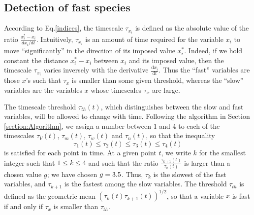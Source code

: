 \documentclass{llncs}
\newcommand{\D}[2]{ \ensuremath{ \frac{\mathrm{d} #1 }{\mathrm{d} #2 } }}
\begin{document}
%        


\iffalse\FloatBarrier\fi
\subsection{Detection of fast species}
According to Eq.\eqref{indices}, the timescale $\tau_{x_i}$  is defined as the
absolute value of the ratio $\frac{x_i^*-x_i}{dx_i/dt}$.  Intuitively,
$\tau_{x_i}$ is an amount of time required for the variable $x_i$ to move
``significantly'' in the direction of its imposed value $x_i^*$. Indeed, if we
hold constant the distance $x_i^*-x_i$ between $x_i$ and its imposed value,
then the timescale $\tau_{x_i}$ varies inversely with the derivative
$\D{x_i}{t}$.  Thus the ``fast'' variables are those $x$'s such that $\tau_x$
is smaller than some given threshold, whereas the ``slow'' variables are the
variables $x$ whose timescales $\tau_x$ are large.

	The timescale threshold $\tau_{th}(t)$, which distinguishes between the
	slow and fast variables, will be allowed to change with time.  Following
	the algorithm in Section \ref{section:Algorithm}, we assign a number
	between 1 and 4 to each of the timescales $\tau_V(t)$, $\tau_m(t)$,
	$\tau_w(t)$ and $\tau_n(t)$, so that the inequality $$\tau_1(t) \leq
	\tau_2(t) \leq \tau_3(t) \leq \tau_4(t)$$ is satisfied for each point in
	time.  At a given point $t$, we write $k$ for the smallest integer such
	that $1\leq k\leq4$ and such that the ratio
	$\frac{\tau_{k+1}(t)}{\tau_k(t)}$ is larger than a chosen value $g$; we
	have chosen $g=3.5$.  Thus, $\tau_k$ is the slowest of the fast
	variables, and $\tau_{k+1}$ is the fastest among the slow variables.  The
	threshold $\tau_{th}$ is defined as the geometric mean
	$(\tau_k(t)\tau_{k+1}(t))^{1/2}$, so that a variable $x$ is fast if and
	only if $\tau_x$ is smaller than $\tau_{th}$.
\end{document}
